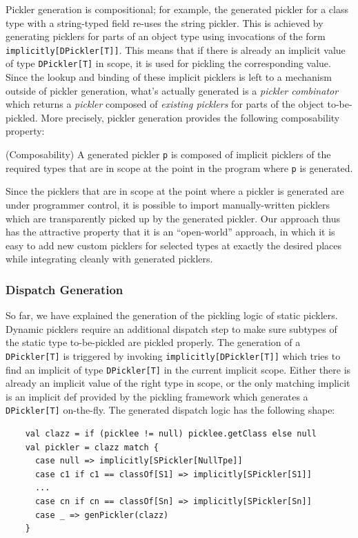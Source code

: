 \documentclass[preprint,10pt]{sigplanconf}
\theoremstyle{definition}
\theoremstyle{definition}
\newcommand{\term}[1]{\mbox{\texttt{#1}}}
\begin{document}
Pickler generation is compositional; for example, the generated pickler for a
class type with a string-typed field re-uses the string pickler. This is
achieved by generating picklers for parts of an object type using invocations
of the form \verb|implicitly[DPickler[T]]|. This means that if there is
already an implicit value of type \term{DPickler[T]} in scope, it is used for
pickling the corresponding value. Since the lookup and binding of these
implicit picklers is left to a mechanism outside of pickler generation, what's
actually generated is a {\em pickler combinator} which returns a {\em pickler}
composed of {\em existing picklers} for parts of the object to-be-pickled.
More precisely, pickler generation provides the following composability
property:

\begin{prop}{(Composability)}
A generated pickler \term{p} is composed of implicit picklers of the required
types that are in scope at the point in the program where \term{p} is
generated.
\end{prop}

Since the picklers that are in scope at the point where a pickler is generated
are under programmer control, it is possible to import manually-written
picklers which are transparently picked up by the generated pickler. Our
approach thus has the attractive property that it is an ``open-world''
approach, in which it is easy to add new custom picklers for selected types at
exactly the desired places while integrating cleanly with generated picklers.

\subsubsection{Dispatch Generation}

So far, we have explained the generation of the pickling logic of static
picklers. Dynamic picklers require an additional dispatch step to make sure
subtypes of the static type to-be-pickled are pickled properly. The generation
of a \term{DPickler[T]} is triggered by invoking
\verb|implicitly[DPickler[T]]| which tries to find an implicit of type
\term{DPickler[T]} in the current implicit scope. Either there is already an
implicit value of the right type in scope, or the only matching implicit is an
implicit def provided by the pickling framework which generates a
\term{DPickler[T]} on-the-fly. The generated dispatch logic has the following
shape:

\begin{lstlisting}
    val clazz = if (picklee != null) picklee.getClass else null
    val pickler = clazz match {
      case null => implicitly[SPickler[NullTpe]]
      case c1 if c1 == classOf[S1] => implicitly[SPickler[S1]]
      ...
      case cn if cn == classOf[Sn] => implicitly[SPickler[Sn]]
      case _ => genPickler(clazz)
    }
\end{lstlisting}
\end{document}
